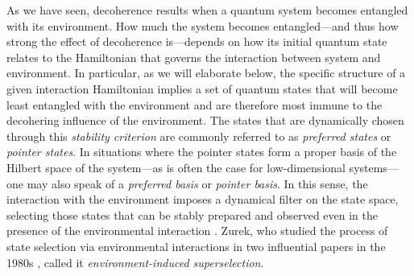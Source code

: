 \documentclass[3p,sort&compress,12pt]{elsarticle}
\begin{document}
As we have seen, decoherence results when a quantum system becomes entangled with its environment. How much the system becomes entangled---and thus how strong the effect of decoherence is---depends on how its initial quantum state relates to the Hamiltonian that governs the interaction between system and environment. In particular, as we will elaborate below, the specific structure of a given interaction Hamiltonian implies a set of quantum states that will become least entangled with the environment and are therefore most immune to the decohering influence of the environment. The states that are dynamically chosen through this \emph{stability criterion} \cite{Zurek:1981:dd,Zurek:1982:tv} are commonly referred to as \emph{preferred states} or \emph{pointer states}. In situations where the pointer states form a proper basis of the Hilbert space of the system---as is often the case for low-dimensional systems---one may also speak of a \emph{preferred basis} or \emph{pointer basis}. In this sense, the interaction with the environment imposes a dynamical filter on the state space, selecting those states that can be stably prepared and observed even in the presence of the environmental interaction \cite{Zeh:1970:yt,Kubler:1973:ux,Zurek:1981:dd,Zurek:1982:tv,Walls:1985:lm}. Zurek, who studied the process of state selection via environmental interactions in two influential papers in the 1980s \cite{Zurek:1981:dd,Zurek:1982:tv}, called it \emph{environment-induced superselection}. 
\end{document}
